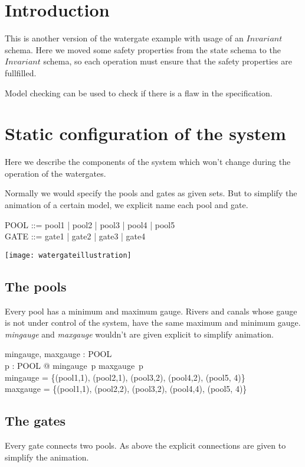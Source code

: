 \documentclass[a4paper]{article}
\begin{document}
\section{Introduction}
This is another version of the watergate example with usage of an
$Invariant$ schema. Here we moved some safety properties 
from the state schema to the $Invariant$ schema,
so each operation must ensure that the safety properties are
fullfilled. 

Model checking can be used to check if there is a flaw in the specification.

\section{Static configuration of the system}
Here we describe the components of the system which won't change
during the operation of the watergates.

Normally we would specify the pools and gates as given sets. But
to simplify the animation of a certain model, we explicit name each pool
and gate.
\begin{zed}
  POOL ::= pool1 | pool2 | pool3 | pool4 | pool5\\
  GATE ::= gate1 | gate2 | gate3 | gate4
\end{zed}

\begin{center}
  \texttt{[image: watergateillustration]}
\end{center}

\subsection{The pools}
Every pool has a minimum and maximum gauge. Rivers and canals
whose gauge is not under control of the system, have the same
maximum and minimum gauge. \emph{mingauge} and \emph{maxgauge}
wouldn't are given explicit to simplify animation.

\begin{axdef}
  mingauge, maxgauge : POOL \fun \nat\\
  \where
  \forall p : POOL @ mingauge~p \leq maxgauge~p\\
  mingauge = \{(pool1,1), (pool2,1), (pool3,2), (pool4,2), (pool5, 4)\}\\
  maxgauge = \{(pool1,1), (pool2,2), (pool3,2), (pool4,4), (pool5, 4)\}\\
\end{axdef}

\subsection{The gates}
Every gate connects two pools. As above the explicit connections are
given to simplify the animation.
\end{document}
